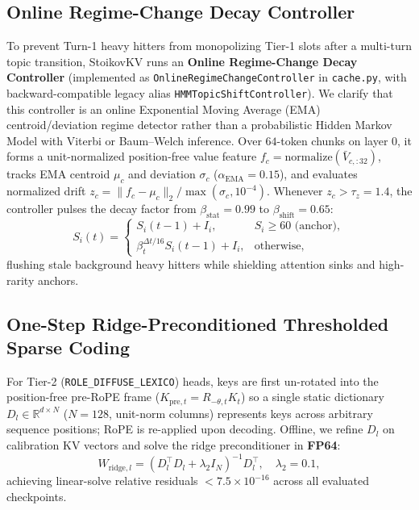 \documentclass[conference]{IEEEtran}
\begin{document}
\subsection{Online Regime-Change Decay Controller}
To prevent Turn-1 heavy hitters from monopolizing Tier-1 slots after a multi-turn topic transition, StoikovKV runs an \textbf{Online Regime-Change Decay Controller} (implemented as \texttt{OnlineRegimeChangeController} in \texttt{cache.py}, with backward-compatible legacy alias \texttt{HMMTopicShiftController}). We clarify that this controller is an online Exponential Moving Average (EMA) centroid/deviation regime detector rather than a probabilistic Hidden Markov Model with Viterbi or Baum--Welch inference. Over $64$-token chunks on layer $0$, it forms a unit-normalized position-free value feature $f_c = \text{normalize}(\bar{V}_{c, :32})$, tracks EMA centroid $\mu_c$ and deviation $\sigma_c$ ($\alpha_{\text{EMA}} = 0.15$), and evaluates normalized drift $z_c = \|f_c - \mu_c\|_2 / \max(\sigma_c, 10^{-4})$. Whenever $z_c > \tau_z = 1.4$, the controller pulses the decay factor from $\beta_{\text{stat}} = 0.99$ to $\beta_{\text{shift}} = 0.65$:
\begin{equation}
S_i(t) = \begin{cases}
S_i(t-1) + I_i, & S_i \ge 60\text{ (anchor)}, \\
\beta_t^{\Delta t / 16} S_i(t-1) + I_i, & \text{otherwise},
\end{cases}
\label{eq:regime_decay}
\end{equation}
flushing stale background heavy hitters while shielding attention sinks and high-rarity anchors.

\subsection{One-Step Ridge-Preconditioned Thresholded Sparse Coding}
For Tier-2 (\texttt{ROLE\_DIFFUSE\_LEXICO}) heads, keys are first un-rotated into the position-free pre-RoPE frame ($K_{\text{pre},t} = R_{-\theta,t} K_t$) so a single static dictionary $D_l \in \mathbb{R}^{d \times N}$ ($N = 128$, unit-norm columns) represents keys across arbitrary sequence positions; RoPE is re-applied upon decoding. Offline, we refine $D_l$ on calibration KV vectors and solve the ridge preconditioner in \textbf{FP64}:
\begin{equation}
W_{\text{ridge}, l} = \left(D_l^\top D_l + \lambda_2 I_N\right)^{-1} D_l^\top, \quad \lambda_2 = 0.1,
\label{eq:w_ridge}
\end{equation}
achieving linear-solve relative residuals $< 7.5 \times 10^{-16}$ across all evaluated checkpoints.
\end{document}
